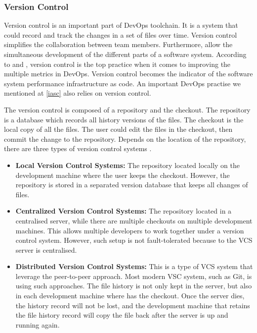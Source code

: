 \subsubsection{Version Control}
Version control is an important part of DevOps toolchain. It is a system that could record and track the changes in a set of files over time. Version control simplifies the collaboration between team members. Furthermore, allow the simultaneous development of the different parts of a software system. According to \cite{Sourcean53:online} and \cite{velasquez2014state}, version control is the top practice when it comes to improving the multiple metrics in DevOps. Version control becomes the indicator of the software system performance \cite{Sourcean53:online} infrastructure as code. An important DevOps practise we mentioned at \ref{iasc} also relies on version control.
\par
The version control is composed of a repository and the checkout. The repository is a database which records all history versions of the files. The checkout is the local copy of all the files. The user could edit the files in the checkout, then commit the change to the repository. Depends on the location of the repository, there are three types of version control systems \cite{VCS}.
\begin{itemize}
    \item \textbf{Local Version Control Systems:} The repository located locally on the development machine where the user keeps the checkout. However, the repository is stored in a separated version database that keeps all changes of files. 
    \item \textbf{Centralized Version Control Systems:} The repository located in a centralised server, while there are multiple checkouts on multiple development machines. This allows multiple developers to work together under a version control system. However, such setup is not fault-tolerated because to the VCS server is centralised.
    \item \textbf{Distributed Version Control Systems:} This is a type of VCS system that leverage the peer-to-peer approach. Most modern VSC system, such as Git, is using such approaches. The file history is not only kept in the server, but also in each development machine where has the checkout. Once the server dies, the history record will not be lost, and the development machine that retains the file history record will copy the file back after the server is up and running again.
\end{itemize}
